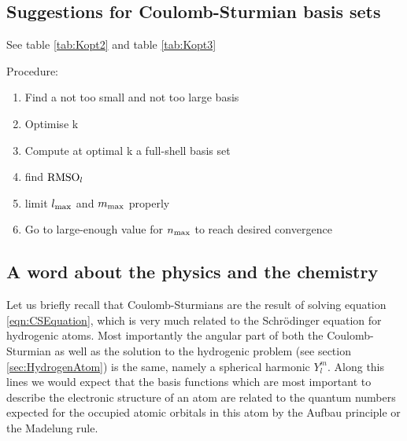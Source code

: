 \subsection{Suggestions for Coulomb-Sturmian basis sets}



See table \vref{tab:Kopt2} and table \vref{tab:Kopt3} %








Procedure:
\begin{enumerate}
	\item Find a not too small and not too large basis
	\item Optimise k
	\item Compute at optimal k a full-shell basis set
	\item find $\text{RMSO}_l$
	\item limit $l_\text{max}$ and $m_\text{max}$ properly
	\item Go to large-enough value for $n_\text{max}$ to reach desired convergence
\end{enumerate}

\subsection{A word about the physics and the chemistry}
Let us briefly recall that Coulomb-Sturmians are the result of
solving equation \eqref{eqn:CSEquation},
which is very much related to the Schrödinger equation for hydrogenic atoms.
Most importantly the angular part of both the Coulomb-Sturmian
as well as the solution to the hydrogenic problem (see section \vref{sec:HydrogenAtom})
is the same, namely a spherical harmonic $Y_l^m$.
Along this lines we would expect that the \CS basis functions
which are most important to describe the electronic structure
of an atom are related to the quantum numbers expected
for the occupied atomic orbitals in this atom by the Aufbau principle
or the Madelung rule.



